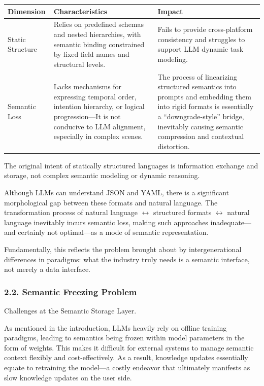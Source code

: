 \documentclass[conference]{IEEEtran}
\begin{document}
\begin{table}[htbp]
\centering
\begin{tabularx}{\textwidth}{l>{\raggedright\arraybackslash}X>{\raggedright\arraybackslash}X}
\toprule
Dimension & Characteristics & Impact \\
\midrule
Static Structure & 
Relies on predefined schemas and nested hierarchies, with semantic binding constrained by fixed field names and structural levels. & 
Fails to provide cross-platform consistency and struggles to support LLM dynamic task modeling. \\

Semantic Loss & 
Lacks mechanisms for expressing temporal order, intention hierarchy, or logical progression---It is not conducive to LLM alignment, especially in complex scenes. & 
The process of linearizing structured semantics into prompts and embedding them into rigid formats is essentially a ``downgrade-style'' bridge, inevitably causing semantic compression and contextual distortion. \\
\bottomrule
\end{tabularx}
\label{tab:your_label}
\end{table}


The original intent of statically structured languages is information
exchange and storage, not complex semantic modeling or dynamic
reasoning.

Although LLMs can \textquotesingle understand\textquotesingle{} JSON and
YAML, there is a significant morphological gap between these formats and
natural language. The transformation process of natural language $\leftrightarrow$
structured formats $\leftrightarrow$ natural language inevitably incurs semantic loss,
making such approaches inadequate---and certainly not optimal---as a
mode of semantic representation.

Fundamentally, this reflects the problem brought about by
intergenerational differences in paradigms: what the industry truly
needs is a semantic interface, not merely a data interface.

\subsubsection{2.2. Semantic Freezing
Problem}\label{22-semantic-freezing-problem}

Challenges at the Semantic Storage Layer.

As mentioned in the introduction, LLMs heavily rely on offline training
paradigms, leading to semantics being frozen within model parameters in
the form of weights. This makes it difficult for external systems to
manage semantic context flexibly and cost-effectively. As a result,
knowledge updates essentially equate to retraining the model---a costly
endeavor that ultimately manifests as slow knowledge updates on the user
side.
\end{document}
